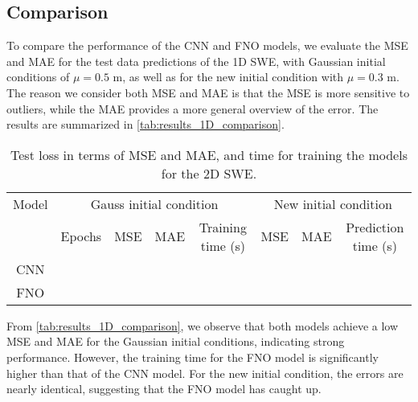 \subsection*{Comparison}
To compare the performance of the CNN and FNO models, we evaluate the MSE and MAE for the test data predictions of the 1D SWE, with Gaussian initial conditions of $\mu = 0.5$ m, as well as for the new initial condition with $\mu = 0.3$ m.
The reason we consider both MSE and MAE is that the MSE is more sensitive to outliers, while the MAE provides a more general overview of the error.
The results are summarized in \autoref{tab:results_1D_comparison}.
\begin{table}[H]
    \centering
    \small %
    \begin{tabular}{c|cccc|ccc}
        Model & \multicolumn{4}{c|}{Gauss initial condition} & \multicolumn{3}{c}{New initial condition} \\
        \cline{2-8}
        & Epochs & MSE & MAE & Training time (s)  & MSE & MAE & Prediction time (s) \\
        \hline
        CNN  &
         &
         & 
         &
         &
         &
         &
         
        \\
        \hline
        FNO  &
         &
         &
         &
         &
         &
         &
        
        \\
        \hline
    \end{tabular}
    \caption{Test loss in terms of MSE and MAE, and time for training the models for the 2D SWE.}\label{tab:results_1D_comparison}
\end{table}
From \autoref{tab:results_1D_comparison}, we observe that both models achieve a low MSE and MAE for the Gaussian initial conditions, indicating strong performance.
However, the training time for the FNO model is significantly higher than that of the CNN model.
For the new initial condition, the errors are nearly identical, suggesting that the FNO model has caught up.

